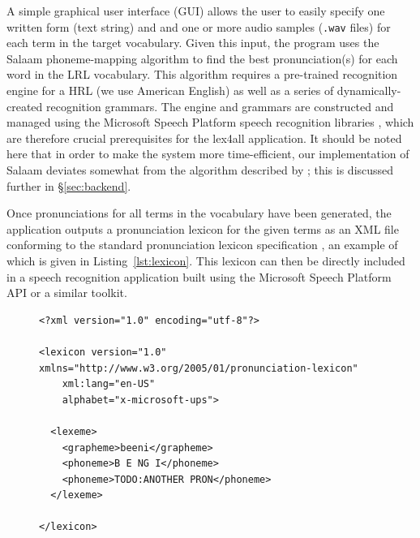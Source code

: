 \documentclass[11pt]{article}
\begin{document}
A simple graphical user interface (GUI) allows the user to easily specify one written form (text string) and and one or more audio samples (\texttt{.wav} files) for each term in the target vocabulary.
Given this input, the program uses the Salaam phoneme-mapping algorithm \cite{Qiao10,Chan12} to find the best pronunciation(s) for each word in the LRL vocabulary. This algorithm requires a pre-trained recognition engine for a HRL (we use American English) as well as a series of dynamically-created recognition grammars. The engine and grammars are constructed and managed using the Microsoft Speech Platform speech recognition libraries \cite{mspsdk}, which are therefore crucial prerequisites for the lex4all application. It should be noted here that in order to make the system more time-efficient, our implementation of Salaam deviates somewhat from the algorithm described by ; this is discussed further in \S\ref{sec:backend}. 

Once pronunciations for all terms in the vocabulary have been generated, the application outputs a pronunciation lexicon for the given terms as an XML file conforming to the standard pronunciation lexicon specification \cite{pls}, an example of which is given in Listing~\ref{lst:lexicon}. This lexicon can then be directly included in a speech recognition application built using the Microsoft Speech Platform API or a similar toolkit.





\begin{figure}
\begin{lstlisting}[caption=Example lexicon file mapping the Yoruba word \textit{beeni} (``yes'') to two possible sequences of American English phonemes., label=lst:lexicon]
<?xml version="1.0" encoding="utf-8"?>
	  
<lexicon version="1.0" xmlns="http://www.w3.org/2005/01/pronunciation-lexicon" 
	xml:lang="en-US" 
	alphabet="x-microsoft-ups">
		 
  <lexeme>
    <grapheme>beeni</grapheme>
    <phoneme>B E NG I</phoneme>
    <phoneme>TODO:ANOTHER PRON</phoneme>
  </lexeme>
  
</lexicon>
\end{lstlisting}
\end{figure}
\end{document}
